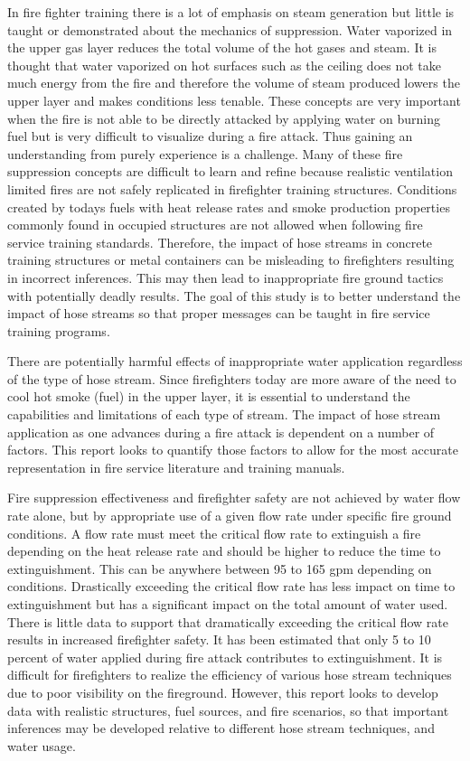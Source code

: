 \documentclass[12pt,oneside]{book}
\begin{document}
In fire fighter training there is a lot of emphasis on steam generation but little is taught or demonstrated about the mechanics of suppression. Water vaporized in the upper gas layer reduces the total volume of the hot gases and steam. It is thought that water vaporized on hot surfaces such as the ceiling does not take much energy from the fire and therefore the volume of steam produced lowers the upper layer and makes conditions less tenable. These concepts are very important when the fire is not able to be directly attacked by applying water on burning fuel but is very difficult to visualize during a fire attack. Thus gaining an understanding from purely experience is a challenge. Many of these fire suppression concepts are difficult to learn and refine because realistic ventilation limited fires are not safely replicated in firefighter training structures. Conditions created by todays fuels with heat release rates and smoke production properties commonly found in occupied structures are not allowed when following fire service training standards. Therefore, the impact of hose streams in concrete training structures or metal containers can be misleading to firefighters resulting in incorrect inferences. This may then lead to inappropriate fire ground tactics with potentially deadly results. The goal of this study is to better understand the impact of hose streams so that proper messages can be taught in fire service training programs.  

There are potentially harmful effects of inappropriate water application regardless of the type of hose stream. Since firefighters today are more aware of the need to cool hot smoke (fuel) in the upper layer, it is essential to understand the capabilities and limitations of each type of stream. The impact of hose stream application as one advances during a fire attack is dependent on a number of factors. This report looks to quantify those factors to allow for the most accurate representation in fire service literature and training manuals. 

Fire suppression effectiveness and firefighter safety are not achieved by water flow rate alone, but by appropriate use of a given flow rate under specific fire ground conditions. A flow rate must meet the critical flow rate to extinguish a fire depending on the heat release rate and should be higher to reduce the time to extinguishment. This can be anywhere between 95 to 165 gpm depending on conditions. Drastically exceeding the critical flow rate has less impact on time to extinguishment but has a significant impact on the total amount of water used. There is little data to support that dramatically exceeding the critical flow rate results in increased firefighter safety. It has been estimated that only 5 to 10 percent of water applied during fire attack contributes to extinguishment. It is difficult for firefighters to realize the efficiency of various hose stream techniques due to poor visibility on the fireground. However, this report looks to develop data with realistic structures, fuel sources, and fire scenarios, so that important inferences may be developed relative to different hose stream techniques, and water usage.
\end{document}
